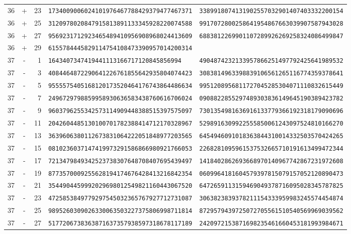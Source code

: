 \begin{longtable}{@{}rcrll@{}}
36&+&23&\texttt{1734009006024101976467788429379477467371}&\texttt{3389918074131902557032901407403332200154}\\
36&+&25&\texttt{3120978020847915813891133345928220074588}&\texttt{9917072800258641954867663039907587943028}\\
36&+&27&\texttt{9569231712923465489410956908968024413609}&\texttt{6883812269901107289926269258324086499847}\\
36&+&29&\texttt{6155784445829114754108473390957014200314}&\texttt{}\\
37&-&1&\texttt{1643407347419441113166717120845856994}&\texttt{4904874232133957866251497792425641989532}\\
37&-&3&\texttt{4084464872290641226761855642935804074423}&\texttt{3083814963398839106561265116774359378641}\\
37&-&5&\texttt{9555575405168120173520464176743864486634}&\texttt{9951208956811727045285304071110832615449}\\
37&-&7&\texttt{2496729798859958930636583438760616706024}&\texttt{0908822855297489303836149645190389423782}\\
37&-&9&\texttt{9603796255342573114909448388515397575097}&\texttt{7301354981636916133779366192318179090696}\\
37&-&11&\texttt{2042604485130100701782388414712170328967}&\texttt{5298916309922555850061243097524810166270}\\
37&-&13&\texttt{3639606380112673831064222051848977203565}&\texttt{6454946091018363844310014332503570424265}\\
37&-&15&\texttt{0810236037147419973291586866980921766053}&\texttt{2268281095961537532665710191613499472344}\\
37&-&17&\texttt{7213479849342523738307648708407695439497}&\texttt{1418402862693668970140967742867231972608}\\
37&-&19&\texttt{8773570009255628194174676428413216842354}&\texttt{0609964181604579397815079157052120890473}\\
37&-&21&\texttt{3544904459992029698012549821160443067520}&\texttt{6472659113159469049378716095028345787825}\\
37&-&23&\texttt{4725853849779297545032365767927712731087}&\texttt{3063823839378211154333959983245574454874}\\
37&-&25&\texttt{9895260309026330063503227375806998711814}&\texttt{8729579439725072705561510540569969039562}\\
37&-&27&\texttt{5177206738363871637357938597318678117189}&\texttt{2420972153871698235461660453181993984671}\\

\end{longtable}

